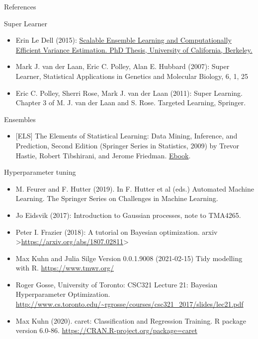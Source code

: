 \documentclass[
  ignorenonframetext,
]{beamer}
\providecommand{\tightlist}{%
  \setlength{\itemsep}{0pt}\setlength{\parskip}{0pt}}
\begin{document}
\begin{frame}{References}
\protect\hypertarget{references}{}

\begin{block}{Super Learner}

\begin{itemize}
\item
  Erin Le Dell (2015):
  \href{https://escholarship.org/uc/item/3kb142r2}{Scalable Ensemble
  Learning and Computationally Efficient Variance Estimation. PhD
  Thesis, University of California, Berkeley.}
\item
  Mark J. van der Laan, Eric C. Polley, Alan E. Hubbard (2007): Super
  Learner, Statistical Applications in Genetics and Molecular Biology,
  6, 1, 25
\item
  Eric C. Polley, Sherri Rose, Mark J. van der Laan (2011): Super
  Learning. Chapter 3 of M. J. van der Laan and S. Rose. Targeted
  Learning, Springer.
\end{itemize}

\end{block}

\begin{block}{Ensembles}

\begin{itemize}
\tightlist
\item
  {[}ELS{]} The Elements of Statistical Learning: Data Mining,
  Inference, and Prediction, Second Edition (Springer Series in
  Statistics, 2009) by Trevor Hastie, Robert Tibshirani, and Jerome
  Friedman.
  \href{https://web.stanford.edu/~hastie/Papers/ESLII.pdf}{Ebook}.
\end{itemize}

\end{block}

\begin{block}{Hyperparameter tuning}

\begin{itemize}
\item
  M. Feurer and F. Hutter (2019). In F. Hutter et al (eds.) Automated
  Machine Learning. The Springer Series on Challenges in Machine
  Learning.
\item
  Jo Eidsvik (2017): Introduction to Gaussian processes, note to
  TMA4265.
\item
  Peter I. Frazier (2018): A tutorial on Bayesian optimization. arxiv
  \textgreater{}\url{https://arxiv.org/abs/1807.02811}\textgreater{}
\item
  Max Kuhn and Julia Silge Version 0.0.1.9008 (2021-02-15) Tidy
  modelling with R. \url{https://www.tmwr.org/}
\item
  Roger Gosse, University of Toronto: CSC321 Lecture 21: Bayesian
  Hyperparameter Optimization.
  \url{http://www.cs.toronto.edu/~rgrosse/courses/csc321_2017/slides/lec21.pdf}
\item
  Max Kuhn (2020). caret: Classification and Regression Training. R
  package version 6.0-86. \url{https://CRAN.R-project.org/package=caret}
\end{itemize}

\end{block}

\end{frame}
\end{document}
